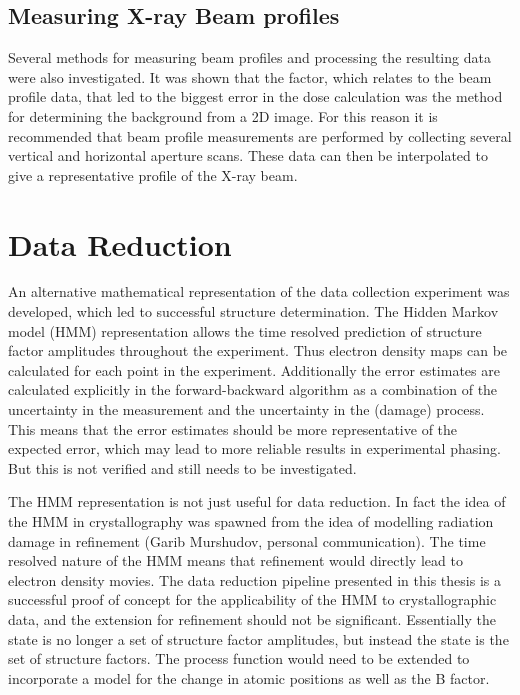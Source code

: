 \subsection{Measuring X-ray Beam profiles}
\label{sub:Measuring X-ray Beam profiles}
Several methods for measuring beam profiles and processing the resulting data were also investigated.
It was shown that the factor, which relates to the beam profile data, that led to the biggest error in the dose calculation was the method for determining the background from a 2D image.
For this reason it is recommended that beam profile measurements are performed by collecting several vertical and horizontal aperture scans.
These data can then be interpolated to give a representative profile of the X-ray beam.

\section{Data Reduction}
\label{sec:Data Reduction}
An alternative mathematical representation of the data collection experiment was developed, which led to successful structure determination.
The Hidden Markov model (HMM) representation allows the time resolved prediction of structure factor amplitudes throughout the experiment.
Thus electron density maps can be calculated for each point in the experiment.
Additionally the error estimates are calculated explicitly in the forward-backward algorithm as a combination of the uncertainty in the measurement and the uncertainty in the (damage) process.
This means that the error estimates should be more representative of the expected error, which may lead to more reliable results in experimental phasing.
But this is not verified and still needs to be investigated.

The HMM representation is not just useful for data reduction.
In fact the idea of the HMM in crystallography was spawned from the idea of modelling radiation damage in refinement (Garib Murshudov, personal communication).
The time resolved nature of the HMM means that refinement would directly lead to electron density movies.
The data reduction pipeline presented in this thesis is a successful proof of concept for the applicability of the HMM to crystallographic data, and the extension for refinement should not be significant.
Essentially the state is no longer a set of structure factor amplitudes, but instead the state is the set of structure factors.
The process function would need to be extended to incorporate a model for the change in atomic positions as well as the B factor.

